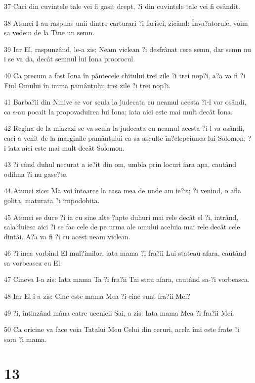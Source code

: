 \par 37 Caci din cuvintele tale vei fi gasit drept, ?i din cuvintele tale vei fi osândit.
\par 38 Atunci I-au raspuns unii dintre carturari ?i farisei, zicând: Înva?atorule, voim sa vedem de la Tine un semn.
\par 39 Iar El, raspunzând, le-a zis: Neam viclean ?i desfrânat cere semn, dar semn nu i se va da, decât semnul lui Iona proorocul.
\par 40 Ca precum a fost Iona în pântecele chitului trei zile ?i trei nop?i, a?a va fi ?i Fiul Omului în inima pamântului trei zile ?i trei nop?i.
\par 41 Barba?ii din Ninive se vor scula la judecata cu neamul acesta ?i-l vor osândi, ca s-au pocait la propovaduirea lui Iona; iata aici este mai mult decât Iona.
\par 42 Regina de la miazazi se va scula la judecata cu neamul acesta ?i-l va osândi, caci a venit de la marginile pamântului ca sa asculte în?elepciunea lui Solomon, ?i iata aici este mai mult decât Solomon.
\par 43 ?i când duhul necurat a ie?it din om, umbla prin locuri fara apa, cautând odihna ?i nu gase?te.
\par 44 Atunci zice: Ma voi întoarce la casa mea de unde am ie?it; ?i venind, o afla golita, maturata ?i împodobita.
\par 45 Atunci se duce ?i ia cu sine alte ?apte duhuri mai rele decât el ?i, intrând, sala?luiesc aici ?i se fac cele de pe urma ale omului aceluia mai rele decât cele dintâi. A?a va fi ?i cu acest neam viclean.
\par 46 ?i înca vorbind El mul?imilor, iata mama ?i fra?ii Lui stateau afara, cautând sa vorbeasca cu El.
\par 47 Cineva I-a zis: Iata mama Ta ?i fra?ii Tai stau afara, cautând sa-?i vorbeasca.
\par 48 Iar El i-a zis: Cine este mama Mea ?i cine sunt fra?ii Mei?
\par 49 ?i, întinzând mâna catre ucenicii Sai, a zis: Iata mama Mea ?i fra?ii Mei.
\par 50 Ca oricine va face voia Tatalui Meu Celui din ceruri, acela îmi este frate ?i sora ?i mama.

\chapter{13}

